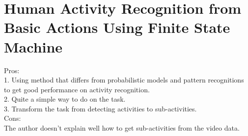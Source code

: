 \documentclass[a4paper]{article}
\begin{document}
\section{Human Activity Recognition from Basic Actions Using
Finite State Machine}

Pros:\\

1. Using method that differs from probabilistic models and pattern recognitions to get good performance on activity recognition.\\

2. Quite a simple way to do on the task.\\

3. Transform the task from detecting activities to sub-activities.\\ 

Cons:
\\

The author doesn't explain well how to get sub-activities from the video data.\\

\end{document}
